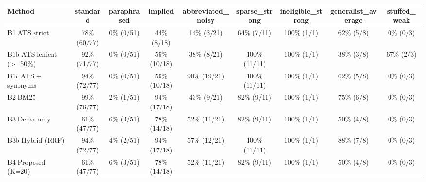 \begin{tabular}{lcccccccc}
\toprule
Method & standard & paraphrased & implied & abbreviated\_noisy & sparse\_strong & ineligible\_strong & generalist\_average & stuffed\_weak \\
\midrule
B1 ATS strict & 78\% (60/77) & 0\% (0/51) & 44\% (8/18) & 14\% (3/21) & 64\% (7/11) & 100\% (1/1) & 62\% (5/8) & 0\% (0/3) \\
B1b ATS lenient (>=50\%) & 92\% (71/77) & 0\% (0/51) & 56\% (10/18) & 38\% (8/21) & 100\% (11/11) & 100\% (1/1) & 38\% (3/8) & 67\% (2/3) \\
B1c ATS + synonyms & 94\% (72/77) & 0\% (0/51) & 56\% (10/18) & 90\% (19/21) & 100\% (11/11) & 100\% (1/1) & 62\% (5/8) & 0\% (0/3) \\
B2 BM25 & 99\% (76/77) & 2\% (1/51) & 94\% (17/18) & 43\% (9/21) & 82\% (9/11) & 100\% (1/1) & 75\% (6/8) & 0\% (0/3) \\
B3 Dense only & 61\% (47/77) & 6\% (3/51) & 78\% (14/18) & 52\% (11/21) & 82\% (9/11) & 100\% (1/1) & 50\% (4/8) & 0\% (0/3) \\
B3b Hybrid (RRF) & 94\% (72/77) & 4\% (2/51) & 94\% (17/18) & 57\% (12/21) & 100\% (11/11) & 100\% (1/1) & 88\% (7/8) & 0\% (0/3) \\
B4 Proposed (K=20) & 61\% (47/77) & 6\% (3/51) & 78\% (14/18) & 52\% (11/21) & 82\% (9/11) & 100\% (1/1) & 50\% (4/8) & 0\% (0/3) \\
\bottomrule
\end{tabular}
